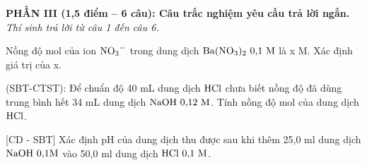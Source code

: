 \documentclass[12pt,a4paper]{article}
\begin{document}
\bigskip
\noindent
\textbf{PHẦN III (1,5 điểm -- 6 câu): Câu trắc nghiệm yêu cầu trả lời ngắn.}\\
\textit{Thí sinh trả lời từ câu 1 đến câu 6.}

\begin{ex}
Nồng độ mol của ion $\ce{NO3-}$ trong dung dịch $\ce{Ba(NO3)2}\ 0{,}1\text{ M}$ là x M. Xác định giá trị của x.
\end{ex}

\begin{ex}
(SBT-CTST): Để chuẩn độ 40 mL dung dịch $\ce{HCl}$ chưa biết nồng độ đã dùng trung bình hết 34 mL dung dịch $\ce{NaOH}\ 0{,}12\text{ M}$. Tính nồng độ mol của dung dịch $\ce{HCl}$.
\end{ex}

\begin{ex}
{[CD - SBT]} Xác định pH của dung dịch thu được sau khi thêm 25,0 ml dung dịch $\ce{NaOH}\ 0{,}1\text{M}$ vào 50,0 ml dung dịch $\ce{HCl}\ 0{,}1\text{ M}$.
\end{ex}
\end{document}
